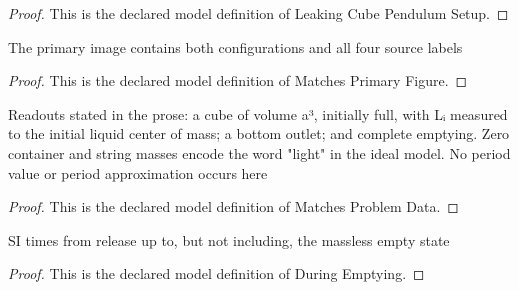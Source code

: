 \begin{proof}
  This is the declared model definition of Leaking Cube Pendulum Setup.
\end{proof}
\begin{definition}
  \label{def:physics:phyx-mini-0238:phyxminiproblems-problemphyxmini0238-matchesprimaryfigure}
  The primary image contains both configurations and all four source labels
\end{definition}
\begin{proof}
  This is the declared model definition of Matches Primary Figure.
\end{proof}
\begin{definition}
  \label{def:physics:phyx-mini-0238:phyxminiproblems-problemphyxmini0238-matchesproblemdata}
  Readouts stated in the prose: a cube of volume a³, initially full, with Lᵢ measured to the initial liquid center of mass; a bottom outlet; and complete emptying. Zero container and string masses encode the word "light" in the ideal model. No period value or period approximation occurs here
\end{definition}
\begin{proof}
  This is the declared model definition of Matches Problem Data.
\end{proof}
\begin{definition}
  \label{def:physics:phyx-mini-0238:phyxminiproblems-problemphyxmini0238-duringemptying}
  SI times from release up to, but not including, the massless empty state
\end{definition}
\begin{proof}
  This is the declared model definition of During Emptying.
\end{proof}
